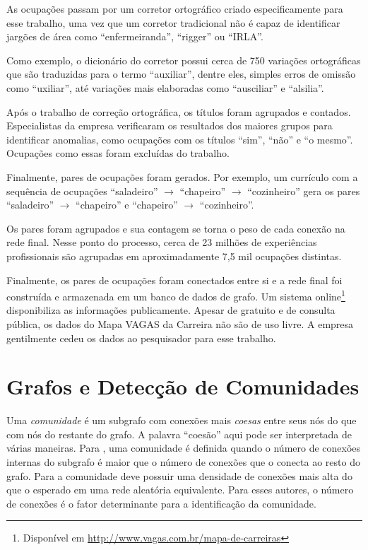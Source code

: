 \documentclass[
  article,
  11pt,
  a4paper,
  english,
  brazil,
  sumario=tradicional]{abntex2}
\begin{document}
As ocupações passam por um corretor ortográfico criado especificamente para esse trabalho, uma vez que um corretor tradicional não é capaz de identificar jargões de área como \enquote{enfermeiranda}, \enquote{rigger} ou \enquote{IRLA}.

Como exemplo, o dicionário do corretor possui cerca de 750 variações ortográficas que são traduzidas para o termo \enquote{auxiliar}, dentre eles, simples erros de omissão como \enquote{uxiliar}, até variações mais elaboradas como \enquote{ausciliar} e \enquote{alsilia}.

Após o trabalho de correção ortográfica, os títulos foram agrupados e contados. Especialistas da empresa verificaram os resultados dos maiores grupos para identificar anomalias, como ocupações com os títulos \enquote{sim}, \enquote{não} e \enquote{o mesmo}. Ocupações como essas foram excluídas do trabalho.

Finalmente, pares de ocupações foram gerados. Por exemplo, um currículo com a sequência de ocupações \enquote{saladeiro} $\to$ \enquote{chapeiro} $\to$ \enquote{cozinheiro} gera os pares \enquote{saladeiro} $\to$ \enquote{chapeiro} e \enquote{chapeiro} $\to$ \enquote{cozinheiro}.

Os pares foram agrupados e sua contagem se torna o peso de cada conexão na rede final. Nesse ponto do processo, cerca de 23 milhões de experiências profissionais são agrupadas em aproximadamente 7,5 mil ocupações distintas.


Finalmente, os pares de ocupações foram conectados entre si e a rede final foi construída e armazenada em um banco de dados de grafo. Um sistema online\footnote{Disponível em \url{http://www.vagas.com.br/mapa-de-carreiras}} disponibiliza as informações publicamente. Apesar de gratuito e de consulta pública, os dados do Mapa VAGAS da Carreira não são de uso livre. A empresa gentilmente cedeu os dados ao pesquisador para esse trabalho.

\section{Grafos e Detecção de Comunidades} \label{sec:comunidades}

Uma \textit{comunidade} é um subgrafo com conexões mais \textit{coesas} entre seus nós do que com nós do restante do grafo. A palavra \enquote{coesão} aqui pode ser interpretada de várias maneiras. Para , uma comunidade é definida quando o número de conexões internas do subgrafo é maior que o número de conexões que o conecta ao resto do grafo. Para  a comunidade deve possuir uma densidade de conexões mais alta do que o esperado em uma rede aleatória equivalente. Para esses autores, o número de conexões é o fator determinante para a identificação da comunidade.
\end{document}

